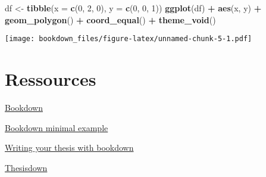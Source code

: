\documentclass[]{book}
\newenvironment{Shaded}{\begin{snugshade}}{\end{snugshade}}
\newcommand{\DataTypeTok}[1]{\textcolor[rgb]{0.13,0.29,0.53}{#1}}
\newcommand{\DecValTok}[1]{\textcolor[rgb]{0.00,0.00,0.81}{#1}}
\newcommand{\KeywordTok}[1]{\textcolor[rgb]{0.13,0.29,0.53}{\textbf{#1}}}
\newcommand{\NormalTok}[1]{#1}
\newcommand{\OperatorTok}[1]{\textcolor[rgb]{0.81,0.36,0.00}{\textbf{#1}}}
\newcommand{\StringTok}[1]{\textcolor[rgb]{0.31,0.60,0.02}{#1}}
\theoremstyle{definition}
\theoremstyle{definition}
\theoremstyle{definition}
\theoremstyle{remark}
\begin{document}
\begin{Shaded}
\begin{Highlighting}[]
\NormalTok{df <-}\StringTok{ }\KeywordTok{tibble}\NormalTok{(}\DataTypeTok{x =} \KeywordTok{c}\NormalTok{(}\DecValTok{0}\NormalTok{, }\DecValTok{2}\NormalTok{, }\DecValTok{0}\NormalTok{), }\DataTypeTok{y =} \KeywordTok{c}\NormalTok{(}\DecValTok{0}\NormalTok{, }\DecValTok{0}\NormalTok{, }\DecValTok{1}\NormalTok{))}
\KeywordTok{ggplot}\NormalTok{(df) }\OperatorTok{+}
\StringTok{  }\KeywordTok{aes}\NormalTok{(x, y) }\OperatorTok{+}
\StringTok{  }\KeywordTok{geom_polygon}\NormalTok{() }\OperatorTok{+}
\StringTok{  }\KeywordTok{coord_equal}\NormalTok{() }\OperatorTok{+}
\StringTok{  }\KeywordTok{theme_void}\NormalTok{() }
\end{Highlighting}
\end{Shaded}

\texttt{[image: bookdown\_files/figure-latex/unnamed-chunk-5-1.pdf]}

\hypertarget{ressources}{%
\chapter{Ressources}\label{ressources}}

\href{https://bookdown.org/yihui/bookdown/}{Bookdown}

\href{https://bookdown.org/yihui/bookdown-demo/}{Bookdown minimal example}

\href{https://eddjberry.netlify.com/post/writing-your-thesis-with-bookdown/}{Writing your thesis with bookdown}

\href{https://github.com/ismayc/thesisdown}{Thesisdown}


\end{document}
